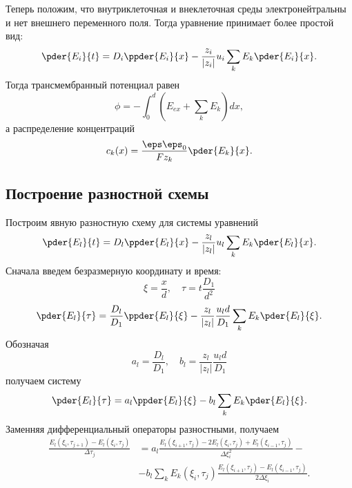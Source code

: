 \documentclass{hedwork}
\begin{document}
    Теперь положим, что внутриклеточная и внеклеточная среды электронейтральны и
    нет внешнего переменного поля. Тогда уравнение принимает более простой вид:
    \begin{equation}
        \pder{E_i}{t} = D_i\ppder{E_i}{x} -
        \frac{z_i}{|z_i|}u_i \sum_{k} E_k \pder{E_i}{x}.
    \end{equation}
    Тогда трансмембранный потенциал равен
    \begin{equation}
        \phi =  -\int_0^d (E_{ex} + \sum_k E_k) dx,
    \end{equation}
    а распределение концентраций
    \begin{equation}
        c_k(x) = \frac{\eps\eps_0}{Fz_k}\pder{E_k}{x}.
    \end{equation}
\subsection{Построение разностной схемы}
    Построим явную разностную схему для системы уравнений
    \begin{equation}
        \pder{E_l}{t} = D_l\ppder{E_l}{x} -
        \frac{z_l}{|z_l|}u_l \sum_{k} E_k \pder{E_l}{x}.
    \end{equation}
    Сначала введем безразмерную координату и время:
    \begin{equation}
        \xi = \frac{x}{d},\quad \tau = t\frac{D_1}{d^2}
    \end{equation}
    \begin{equation}
        \pder{E_l}{\tau} = \frac{D_l}{D_1}\ppder{E_l}{\xi} -
        \frac{z_l}{|z_l|}\frac{u_ld}{D_1} \sum_{k} E_k \pder{E_l}{\xi}.
    \end{equation}
    Обозначая
    \begin{equation}
        a_l = \frac{D_l}{D_1},\quad b_l = \frac{z_l}{|z_l|}\frac{u_ld}{D_1}
    \end{equation}
    получаем систему
    \begin{equation}
        \pder{E_l}{\tau} = a_l\ppder{E_l}{\xi} - b_l\sum_k E_k \pder{E_l}{\xi}.
    \end{equation}
    Заменняя дифференциальный операторы разностными, получаем
    \begin{align*}
        \frac{E_l(\xi_i, \tau_{j+1}) - E_l(\xi_i, \tau_j)}{\Delta\tau_j} & =
        a_l\frac{E_l(\xi_{i+1}, \tau_j) - 2E_l(\xi_i, \tau_j) +
        E_l(\xi_{i-1}, \tau_j)}{\Delta\xi_i^2} -\\
        & -b_l\sum_k E_k(\xi_i, \tau_j)
        \frac{E_l(\xi_{i+1}, \tau_j) - E_l(\xi_{i-1}, \tau_j)}{2\Delta\xi_i}.
    \end{align*}
\end{document}
